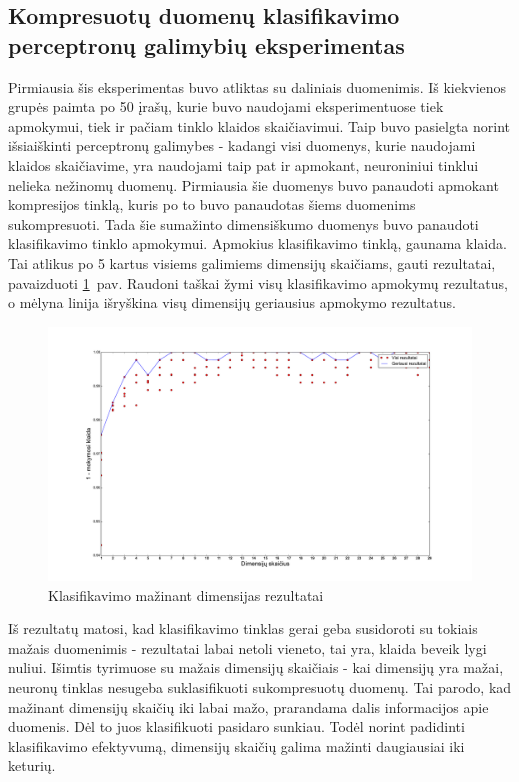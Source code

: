 \documentclass{VUMIFPSbakalaurinis}
\begin{document}
\subsection{Kompresuotų duomenų klasifikavimo perceptronų galimybių eksperimentas}

Pirmiausia šis eksperimentas buvo atliktas su daliniais duomenimis.
Iš kiekvienos grupės paimta po 50 įrašų, kurie buvo naudojami eksperimentuose tiek apmokymui, tiek ir pačiam tinklo klaidos skaičiavimui.
Taip buvo pasielgta norint išsiaiškinti perceptronų galimybes - kadangi visi duomenys, kurie naudojami klaidos skaičiavime, yra naudojami taip pat ir apmokant, neuroniniui tinklui nelieka nežinomų duomenų.
Pirmiausia šie duomenys buvo panaudoti apmokant kompresijos tinklą, kuris po to buvo panaudotas šiems duomenims sukompresuoti.
Tada šie sumažinto dimensiškumo duomenys buvo panaudoti klasifikavimo tinklo apmokymui.
Apmokius klasifikavimo tinklą, gaunama klaida.
Tai atlikus po 5 kartus visiems galimiems dimensijų skaičiams, gauti rezultatai, pavaizduoti \ref{fig:experiment-1}~pav.
Raudoni taškai žymi visų klasifikavimo apmokymų rezultatus, o mėlyna linija išryškina visų dimensijų geriausius apmokymo rezultatus.

\begin{figure}
	\includegraphics[scale=0.32]{pics/dimensions_2015-5-23_15-50-6}
	\caption{Klasifikavimo mažinant dimensijas rezultatai}
	\label{fig:experiment-1}
\end{figure}

Iš rezultatų matosi, kad klasifikavimo tinklas gerai geba susidoroti su tokiais mažais duomenimis - rezultatai labai netoli vieneto, tai yra, klaida beveik lygi nuliui.
Išimtis tyrimuose su mažais dimensijų skaičiais - kai dimensijų yra mažai, neuronų tinklas nesugeba suklasifikuoti sukompresuotų duomenų.
Tai parodo, kad mažinant dimensijų skaičių iki labai mažo, prarandama dalis informacijos apie duomenis.
Dėl to juos klasifikuoti pasidaro sunkiau.
Todėl norint padidinti klasifikavimo efektyvumą, dimensijų skaičių galima mažinti daugiausiai iki keturių.
\end{document}

